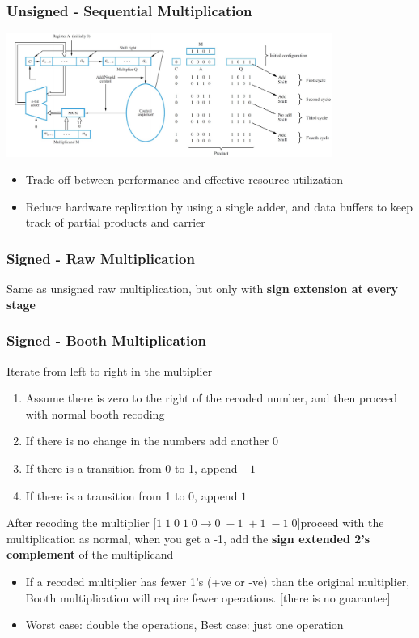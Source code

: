 \documentclass[10pt]{article}
\begin{document}
\subsubsection{Unsigned - Sequential Multiplication}
\includegraphics[width=0.8\textwidth]{arithmetic/sequential.png}
\begin{itemize}
    \item Trade-off between performance and effective resource utilization
    \item Reduce hardware replication by using a single adder, and data buffers to keep track of partial products and carrier
\end{itemize}
\subsubsection{Signed - Raw Multiplication}
Same as unsigned raw multiplication, but only with \textbf{sign extension at every stage}
\subsubsection{Signed - Booth Multiplication}
Iterate from left to right in the multiplier
\begin{enumerate}
    \item Assume there is zero to the right of the recoded number, and then proceed with normal booth recoding
    \item If there is no change in the numbers add another 0
    \item If there is a transition from 0 to 1, append $-1$
    \item If there is a transition from 1 to 0, append $1$
\end{enumerate}
After recoding the multiplier [$1\;1\;0\;1\;0 \to 0\; -1\; +1\; -1\; 0$]proceed with the multiplication as normal, when you get a -1, add the \textbf{sign extended 2's complement} of the multiplicand
\begin{itemize}
    \item If a recoded multiplier has fewer 1’s (+ve or -ve) than the original multiplier, Booth multiplication will require fewer operations. [there is no guarantee]
    \item Worst case: double the operations, Best case: just one operation
\end{itemize}
\end{document}
